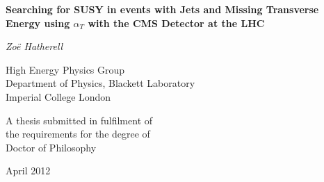 \thispagestyle{plain}

\begin{center}
\LARGE
{\bf  Searching for SUSY in events with Jets and Missing Transverse Energy using $\alpha_{T}$ with the CMS Detector at the LHC}

\vspace{1cm}

\Large
{\it Zo\"e Hatherell}

\vspace{2cm}
\large
High Energy Physics Group\\
Department of Physics, Blackett Laboratory\\
Imperial College London\\
\vspace{2cm}

A thesis submitted in fulfilment of\\
the requirements
for the degree of \\
Doctor of Philosophy\\
\vspace{1cm}

April 2012
\end{center}

